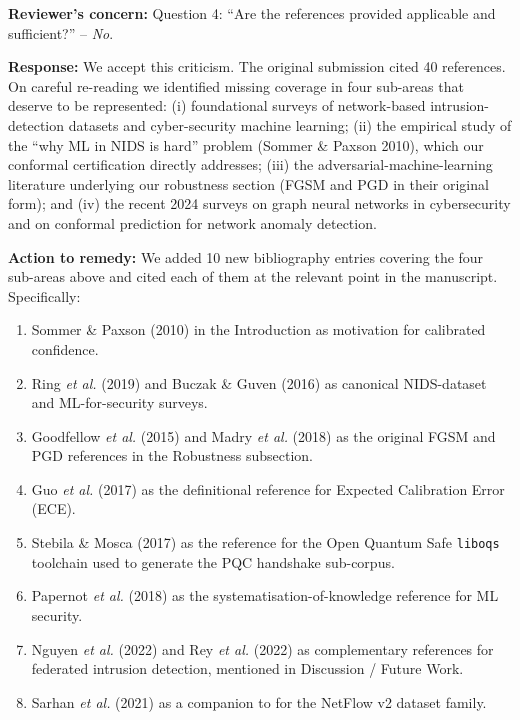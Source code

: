 \documentclass[11pt,a4paper]{article}
\newcommand{\Concern}[1]{\smallskip\noindent\textbf{\textcolor{concern}{Reviewer's concern:}} #1\par}
\newcommand{\Response}[1]{\noindent\textbf{\textcolor{response}{Response:}} #1\par}
\newcommand{\Action}[1]{\noindent\textbf{\textcolor{action}{Action to remedy:}} #1\par}
\begin{document}
\Concern{Question 4: ``Are the references provided applicable and sufficient?'' -- \emph{No}.}
\Response{We accept this criticism. The original submission cited 40 references. On careful re-reading we identified missing coverage in four sub-areas that deserve to be represented: (i) foundational surveys of network-based intrusion-detection datasets and cyber-security machine learning; (ii) the empirical study of the ``why ML in NIDS is hard'' problem (Sommer \& Paxson 2010), which our conformal certification directly addresses; (iii) the adversarial-machine-learning literature underlying our robustness section (FGSM and PGD in their original form); and (iv) the recent 2024 surveys on graph neural networks in cybersecurity and on conformal prediction for network anomaly detection.}
\Action{We added 10 new bibliography entries covering the four sub-areas above and cited each of them at the relevant point in the manuscript. Specifically:
\begin{enumerate}[label=(\alph*),leftmargin=1.5em,itemsep=1pt,topsep=1pt]
  \item Sommer \& Paxson (2010) \cite{sommer2010closedworld} in the Introduction as motivation for calibrated confidence.
  \item Ring \emph{et al.} (2019) \cite{ring2019survey} and Buczak \& Guven (2016) \cite{buczak2016survey} as canonical NIDS-dataset and ML-for-security surveys.
  \item Goodfellow \emph{et al.} (2015) \cite{goodfellow2015fgsm} and Madry \emph{et al.} (2018) \cite{madry2018pgd} as the original FGSM and PGD references in the Robustness subsection.
  \item Guo \emph{et al.} (2017) \cite{guo2017calibration} as the definitional reference for Expected Calibration Error (ECE).
  \item Stebila \& Mosca (2017) \cite{stebila2020liboqs} as the reference for the Open Quantum Safe \texttt{liboqs} toolchain used to generate the PQC handshake sub-corpus.
  \item Papernot \emph{et al.} (2018) \cite{papernot2018sok} as the systematisation-of-knowledge reference for ML security.
  \item Nguyen \emph{et al.} (2022) \cite{nguyen2022federated} and Rey \emph{et al.} (2022) \cite{rey2022federated} as complementary references for federated intrusion detection, mentioned in Discussion / Future Work.
  \item Sarhan \emph{et al.} (2021) \cite{sarhan2021netflowv2} as a companion to \cite{sarhan2022standard} for the NetFlow v2 dataset family.

\end{enumerate}}
\end{document}
